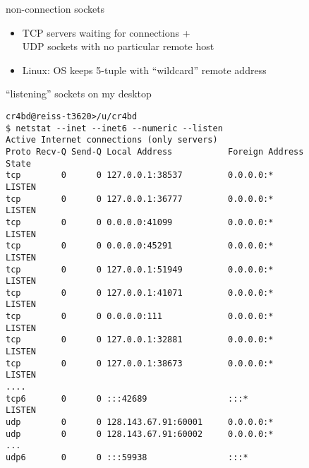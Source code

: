 \begin{frame}{non-connection sockets}
\begin{itemize}
\item TCP servers waiting for connections + \\
UDP sockets with no particular remote host
\item Linux: OS keeps 5-tuple with ``wildcard'' remote address
\end{itemize}
\end{frame}

\begin{frame}[fragile,label=laptopNetstat]{``listening'' sockets on my desktop}
\begin{lstlisting}[language={},basicstyle=\fontsize{9.5}{10.5}\selectfont]
cr4bd@reiss-t3620>/u/cr4bd
$ netstat --inet --inet6 --numeric --listen
Active Internet connections (only servers)
Proto Recv-Q Send-Q Local Address           Foreign Address         State      
tcp        0      0 127.0.0.1:38537         0.0.0.0:*               LISTEN     
tcp        0      0 127.0.0.1:36777         0.0.0.0:*               LISTEN     
tcp        0      0 0.0.0.0:41099           0.0.0.0:*               LISTEN     
tcp        0      0 0.0.0.0:45291           0.0.0.0:*               LISTEN     
tcp        0      0 127.0.0.1:51949         0.0.0.0:*               LISTEN     
tcp        0      0 127.0.0.1:41071         0.0.0.0:*               LISTEN     
tcp        0      0 0.0.0.0:111             0.0.0.0:*               LISTEN     
tcp        0      0 127.0.0.1:32881         0.0.0.0:*               LISTEN     
tcp        0      0 127.0.0.1:38673         0.0.0.0:*               LISTEN     
....
tcp6       0      0 :::42689                :::*                    LISTEN
udp        0      0 128.143.67.91:60001     0.0.0.0:*
udp        0      0 128.143.67.91:60002     0.0.0.0:*
...
udp6       0      0 :::59938                :::* 
\end{lstlisting}
\end{frame}
